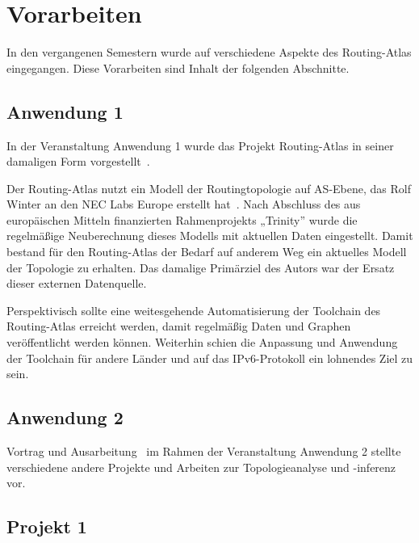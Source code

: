 \section{Vorarbeiten}\label{sec:previous}

In den vergangenen Semestern wurde auf verschiedene Aspekte des Routing-Atlas eingegangen.
Diese Vorarbeiten sind Inhalt der folgenden Abschnitte.

\subsection{Anwendung 1}
In der Veranstaltung Anwendung 1 wurde das Projekt Routing-Atlas in seiner damaligen Form vorgestellt~\cite{KrohnAW1}.

Der Routing-Atlas nutzt ein Modell der Routingtopologie auf AS-Ebene, das Rolf Winter an den NEC Labs Europe erstellt hat~\cite{Winter:2009:MIR:1577959.1577976, neclab-topology}.
Nach Abschluss des aus europäischen Mitteln finanzierten Rahmenprojekts „Trinity” wurde die regelmäßige Neuberechnung dieses Modells mit aktuellen Daten eingestellt.
Damit bestand für den Routing-Atlas der Bedarf auf anderem Weg ein aktuelles Modell der Topologie zu erhalten.
Das damalige Primärziel des Autors war der Ersatz dieser externen Datenquelle.

Perspektivisch sollte eine weitesgehende Automatisierung der Toolchain des Routing-Atlas erreicht werden, damit regelmäßig Daten und Graphen veröffentlicht werden können.
Weiterhin schien die Anpassung und Anwendung der Toolchain für andere Länder und auf das IPv6-Protokoll ein lohnendes Ziel zu sein.

\subsection{Anwendung 2}
Vortrag und Ausarbeitung~\cite{KrohnAW2} im Rahmen der Veranstaltung Anwendung 2 stellte verschiedene andere Projekte und Arbeiten zur Topologieanalyse und -inferenz vor.


\subsection{Projekt 1}


